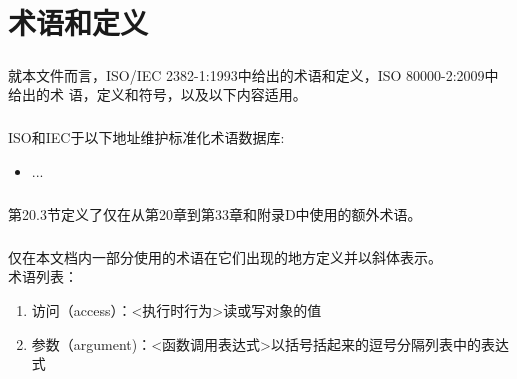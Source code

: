 \chapter{术语和定义}
\paragraph{}
就本文件而言，ISO/IEC 2382-1:1993中给出的术语和定义，ISO 80000-2:2009中给出的术
语，定义和符号，以及以下内容适用。

\paragraph{}
ISO和IEC于以下地址维护标准化术语数据库:
\begin{itemize}
  \item ...
\end{itemize}

\paragraph{}
第20.3节定义了仅在从第20章到第33章和附录D中使用的额外术语。

\paragraph{}
仅在本文档内一部分使用的术语在它们出现的地方定义并以斜体表示。\\

术语列表：

\begin{enumerate}
  \item 访问（access）：<执行时行为>读或写对象的值
  \item 参数（argument)：<函数调用表达式>以括号括起来的逗号分隔列表中的表达式
\end{enumerate}
